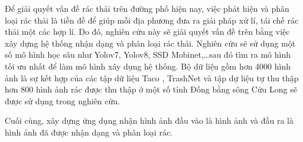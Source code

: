 \documentclass[./thesis.tex]{subfiles}
\begin{document}

{\fontsize{13}{12} \selectfont
Để giải quyết vấn đề rác thải trên đường phố hiện nay, việc phát hiện và phân loại rác thải là tiền đề để giúp mỗi địa phương đưa ra giải pháp xử lí, tái chế rác thải một các hợp lí.
Do đó, nghiên cứu này sẽ giải quyết vấn đề trên bằng việc xây dựng hệ thống nhận dạng và phân loại rác thải. Nghiên cứu sẽ sử dụng một số mô hình học sâu như Yolov7, Yolov8, SSD Mobinet,\dots sau đó tìm ra mô hình tối ưu nhất để làm mô hình xây dụng hệ thống. Bộ dữ liệu gồm hơn 4000 hình ảnh là sự kết hợp của các tập dữ liệu Taco \cite{proença2020taco}, TrashNet \cite{yang2016classification} và tập dự liệu tự thu thập hơn 800 hình ảnh rác được thu thập ở một số tỉnh Đồng bằng sông Cửu Long sẽ được sử dụng trong nghiên cứu.


Cuối cùng, xây dựng ứng dụng nhận hình ảnh đầu vào là hình ảnh và đầu ra là hình ảnh đã được nhận dạng và phân loại rác.
}
\bigskip



\end{document}
